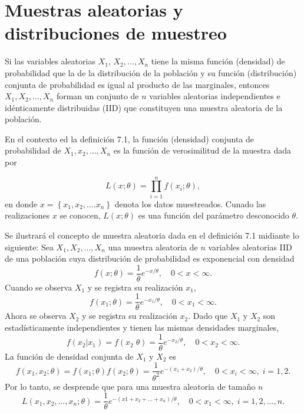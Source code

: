 \chapter{Muestras aleatorias y distribuciones de muestreo}

\begin{def.}
    Si las variables aleatorias $X_1$, $X_2,\ldots, X_n$ tiene la misma función (densidad) de probabilidad que la de la distribución de la población y su función (distribución) conjunta de probabilidad es igual al producto de las marginales, entonces $X_1,X_2,\ldots , X_n$ forman un conjunto de $n$ variables aleatorias independientes e idénticamente distribuidas (IID) que constituyen una muestra aleatoria de la población.
\end{def.}

En el contexto ed la definición 7.1, la función (densidad) conjunta de probabilidad de $X_1,x_2,\ldots,X_n$ es la función de verosimilitud de la muestra dada por
\begin{tcolorbox}
    $$ L(x;\theta)=\prod\limits_{i=1}^n f(x_i; \theta),$$
    en donde $x=\left\{x_1,x_2,\ldots.x_n\right\}$ denota los datos muestreados. Cunado las realizaciones $x$ se conocen, $L(x;\theta)$ es una función del parámetro desconocido $\theta$. 
\end{tcolorbox}

\begin{ejem}
    Se ilustrará el concepto de muestra aleatoria dada en el definición 7.1 midiante lo siguiente: Sea $X_1,X_2,\ldots,X_n$ una muestra aleatoria de $n$ variables aleatorias IID de una población cuya distribución de probabilidad es exponencial con densidad
    $$f(x;\theta)=\dfrac{1}{\theta}e^{-x/\theta},\quad 0<x<\infty.$$
    Cuando se observa $X_1$ y se registra su realización $x_1$,
    $$f(x_1;\theta)=\dfrac{1}{\theta}e^{-x_1/\theta},\quad 0<x_1<\infty.$$
    Ahora se observa $X_2$ y se registra su realización $x_2$. Dado que $X_1$ y $X_2$ son estadísticamente independientes y tienen las mismas densidades marginales,
    $$f(x_2|x_1)=f(x_2\; \theta)=\dfrac{1}{\theta}e^{-x_2/\theta},\quad 0<x_2<\infty.$$
    La función de densidad conjunta de $X_1$ y $X_2$ es
    $$f(x_1,x_2;\theta)=f(x_1;\theta)f(x_2;\theta)=\dfrac{1}{\theta^2}e^{-(x_1+x_2)/\theta},\quad 0<x_i<\infty,\; i=1,2.$$
    Por lo tanto, se desprende que para una muestra aleatoria de tamaño $n$
    $$L(x_1,x_2,\ldots,x_n; \theta)=\dfrac{1}{\theta}e^{-(x1+x_2+\ldots +x_n)/\theta},\quad 0<x_1<\infty,\; i=1,2,\ldots,n.$$
\end{ejem}

